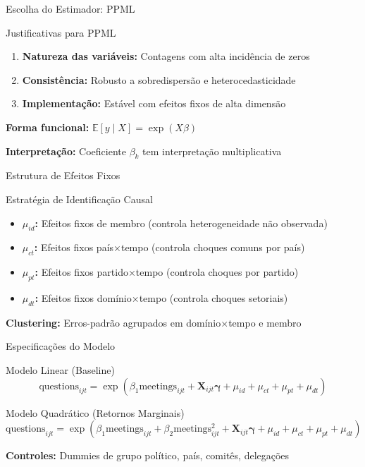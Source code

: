 \documentclass[aspectratio=169]{beamer}
\begin{document}
\begin{frame}{Escolha do Estimador: PPML}
\begin{block}{Justificativas para PPML}
\begin{enumerate}
\item \textbf{Natureza das variáveis:} Contagens com alta incidência de zeros
\item \textbf{Consistência:} Robusto a sobredispersão e heterocedasticidade
\item \textbf{Implementação:} Estável com efeitos fixos de alta dimensão
\end{enumerate}
\end{block}

\vspace{0.3cm}

\textbf{Forma funcional:} $\mathbb{E}[y\mid X] = \exp(X\beta)$

\textbf{Interpretação:} Coeficiente $\beta_k$ tem interpretação multiplicativa
\end{frame}

\begin{frame}{Estrutura de Efeitos Fixos}
\begin{block}{Estratégia de Identificação Causal}
\begin{itemize}
\item \textbf{$\mu_{id}$:} Efeitos fixos de membro (controla heterogeneidade não observada)
\item \textbf{$\mu_{ct}$:} Efeitos fixos país×tempo (controla choques comuns por país)
\item \textbf{$\mu_{pt}$:} Efeitos fixos partido×tempo (controla choques por partido)
\item \textbf{$\mu_{dt}$:} Efeitos fixos domínio×tempo (controla choques setoriais)
\end{itemize}
\end{block}

\vspace{0.3cm}

\textbf{Clustering:} Erros-padrão agrupados em domínio×tempo e membro
\end{frame}

\begin{frame}{Especificações do Modelo}
\begin{block}{Modelo Linear (Baseline)}
\begin{equation}
\text{questions}_{ijt} = \exp(\beta_1 \text{meetings}_{ijt} + \mathbf{X}_{ijt}\boldsymbol{\gamma} + \mu_{id} + \mu_{ct} + \mu_{pt} + \mu_{dt})
\end{equation}
\end{block}

\begin{block}{Modelo Quadrático (Retornos Marginais)}
\begin{equation}
\text{questions}_{ijt} = \exp(\beta_1 \text{meetings}_{ijt} + \beta_2 \text{meetings}_{ijt}^2 + \mathbf{X}_{ijt}\boldsymbol{\gamma} + \mu_{id} + \mu_{ct} + \mu_{pt} + \mu_{dt})
\end{equation}
\end{block}

\textbf{Controles:} Dummies de grupo político, país, comitês, delegações
\end{frame}
\end{document}
